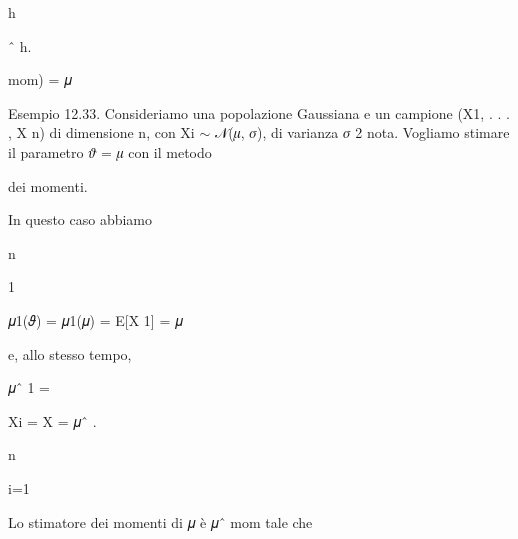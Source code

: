 \documentclass[a4paper,portrait,12pt]{article}
\begin{document}
\begin{flushleft}
h
\end{flushleft}





\begin{flushleft}
ˆ h.
\end{flushleft}


\begin{flushleft}
mom) = 𝜇
\end{flushleft}





\begin{flushleft}
Esempio 12.33. Consideriamo una popolazione Gaussiana e un campione (X1, . . . , X n) di dimensione n, con Xi $\sim$ 𝒩(𝜇, 𝜎), di varianza 𝜎 2 nota. Vogliamo stimare il parametro 𝜗 = 𝜇 con il metodo
\end{flushleft}


\begin{flushleft}
dei momenti.
\end{flushleft}


\begin{flushleft}
In questo caso abbiamo
\end{flushleft}


\begin{flushleft}
n
\end{flushleft}


1


\begin{flushleft}
𝜇1(𝜗) = 𝜇1(𝜇) = E[X 1] = 𝜇
\end{flushleft}


\begin{flushleft}
e, allo stesso tempo,
\end{flushleft}


\begin{flushleft}
𝜇ˆ 1 =
\end{flushleft}


\begin{flushleft}
Xi = X = 𝜇ˆ .
\end{flushleft}


\begin{flushleft}
n
\end{flushleft}


\begin{flushleft}
i=1
\end{flushleft}


\begin{flushleft}
Lo stimatore dei momenti di 𝜇 \`{e} 𝜇ˆ mom tale che
\end{flushleft}
\end{document}
